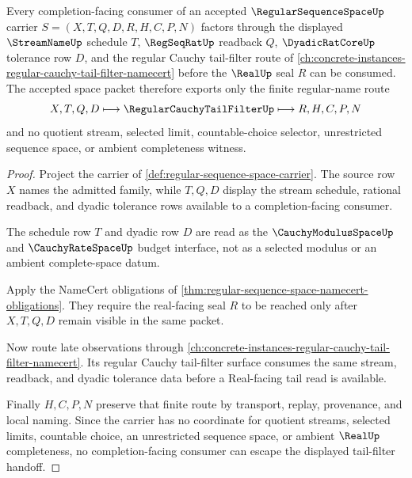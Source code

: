 \begin{theorem}
\label{thm:regular-sequence-space-tail-filter-handoff}
Every completion-facing consumer of an accepted $\RegularSequenceSpaceUp$ carrier $S=(X,T,Q,D,R,H,C,P,N)$ factors through the displayed $\StreamNameUp$ schedule $T$, $\RegSeqRatUp$ readback $Q$, $\DyadicRatCoreUp$ tolerance row $D$, and the regular Cauchy tail-filter route of \autoref{ch:concrete-instances-regular-cauchy-tail-filter-namecert} before the $\RealUp$ seal $R$ can be consumed. The accepted space packet therefore exports only the finite regular-name route
$$
X,T,Q,D \longmapsto \RegularCauchyTailFilterUp \longmapsto R,H,C,P,N
$$
and no quotient stream, selected limit, countable-choice selector, unrestricted sequence space, or ambient completeness witness.
\end{theorem}
\begin{proof}
Project the carrier of \autoref{def:regular-sequence-space-carrier}. The source row $X$ names the admitted family, while $T,Q,D$ display the stream schedule, rational readback, and dyadic tolerance rows available to a completion-facing consumer.

The schedule row $T$ and dyadic row $D$ are read as the $\CauchyModulusSpaceUp$ and $\CauchyRateSpaceUp$ budget interface, not as a selected modulus or an ambient complete-space datum.

Apply the NameCert obligations of \autoref{thm:regular-sequence-space-namecert-obligations}. They require the real-facing seal $R$ to be reached only after $X,T,Q,D$ remain visible in the same packet.

Now route late observations through \autoref{ch:concrete-instances-regular-cauchy-tail-filter-namecert}. Its regular Cauchy tail-filter surface consumes the same stream, readback, and dyadic tolerance data before a Real-facing tail read is available.

Finally $H,C,P,N$ preserve that finite route by transport, replay, provenance, and local naming. Since the carrier has no coordinate for quotient streams, selected limits, countable choice, an unrestricted sequence space, or ambient $\RealUp$ completeness, no completion-facing consumer can escape the displayed tail-filter handoff.
\end{proof}

